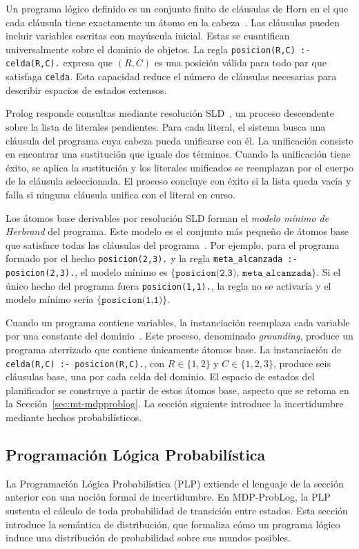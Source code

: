 Un programa lógico definido es un conjunto finito de cláusulas de Horn en el que cada cláusula tiene exactamente un átomo en la cabeza~\cite{russell2016artificial}. Las cláusulas pueden incluir variables escritas con mayúscula inicial. Estas se cuantifican universalmente sobre el dominio de objetos. La regla \texttt{posicion(R,C) :- celda(R,C).} expresa que $(R,C)$ es una posición válida para todo par que satisfaga \texttt{celda}. Esta capacidad reduce el número de cláusulas necesarias para describir espacios de estados extensos.

Prolog responde consultas mediante resolución SLD~\cite{deraedt2007problog}, un proceso descendente sobre la lista de literales pendientes. Para cada literal, el sistema busca una cláusula del programa cuya cabeza pueda unificarse con él. La unificación consiste en encontrar una sustitución que iguale dos términos. Cuando la unificación tiene éxito, se aplica la sustitución y los literales unificados se reemplazan por el cuerpo de la cláusula seleccionada. El proceso concluye con éxito si la lista queda vacía y falla si ninguna cláusula unifica con el literal en curso.

Los átomos base derivables por resolución SLD forman el \emph{modelo mínimo de Herbrand} del programa. Este modelo es el conjunto más pequeño de átomos base que satisface todas las cláusulas del programa~\cite{russell2016artificial}. Por ejemplo, para el programa formado por el hecho \texttt{posicion(2,3).} y la regla \texttt{meta\_alcanzada :- posicion(2,3).}, el modelo mínimo es \(\{\texttt{posicion(2,3)},\,\texttt{meta\_alcanzada}\}\). Si el único hecho del programa fuera \texttt{posicion(1,1).}, la regla no se activaría y el modelo mínimo sería \(\{\texttt{posicion(1,1)}\}\).

Cuando un programa contiene variables, la instanciación reemplaza cada variable por una constante del dominio~\cite{deraedt2007problog}. Este proceso, denominado \textit{grounding}, produce un programa aterrizado que contiene únicamente átomos base. La instanciación de \texttt{celda(R,C) :- posicion(R,C).}, con $R \in \{1,2\}$ y $C \in \{1,2,3\}$, produce seis cláusulas base, una por cada celda del dominio. El espacio de estados del planificador se construye a partir de estos átomos base, aspecto que se retoma en la Sección~\ref{sec:mt-mdpproblog}. La sección siguiente introduce la incertidumbre mediante hechos probabilísticos.

\subsection{Programación Lógica Probabilística}
\label{sec:mt-plp}
La Programación Lógica Probabilística (PLP) extiende el lenguaje de la sección anterior con una noción formal de incertidumbre. En MDP-ProbLog, la PLP sustenta el cálculo de toda probabilidad de transición entre estados. Esta sección introduce la semántica de distribución, que formaliza cómo un programa lógico induce una distribución de probabilidad sobre sus mundos posibles.


